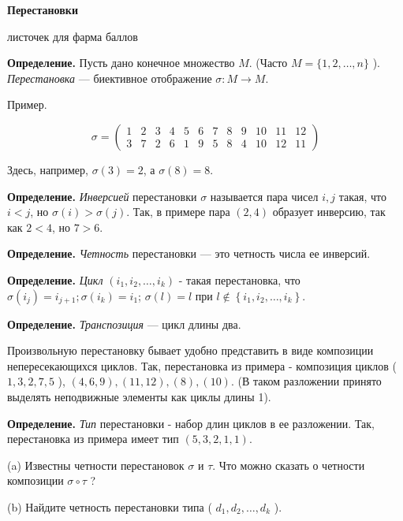 \centerline{\bf \Huge Перестановки}

\begin{flushright}
        \scriptsize{листочек для фарма баллов}
\end{flushright}

\textbf{Определение.} Пусть дано конечное множество $M$. (Часто $M=\{1,2, \ldots, n\}$ ). \textit{Перестановка} --- биективное отображение $\sigma: M \rightarrow M$.

Пример.

$$
\sigma=\left(\begin{array}{llllllllllll}
1 & 2 & 3 & 4 & 5 & 6 & 7 & 8 & 9 & 10 & 11 & 12 \\
3 & 7 & 2 & 6 & 1 & 9 & 5 & 8 & 4 & 10 & 12 & 11
\end{array}\right)
$$


Здесь, например, $\sigma(3)=2$, а $\sigma(8)=8$.

\textbf{Определение.} \textit{Инверсией} перестановки $\sigma$ называется пара чисел $i, j$ такая, что $i<j$, но $\sigma(i)>\sigma(j)$. Так, в примере пара $(2,4)$ образует инверсию, так как $2<4$, но $7>6$.

\textbf{Определение.} \textit{Четность} перестановки --- это четность числа ее инверсий.

\textbf{Определение.} \textit{Цикл} $\left(i_1, i_2, \ldots, i_k\right)$ - такая перестановка, что $\sigma\left(i_j\right)=i_{j+1} ; \sigma\left(i_k\right)=i_1$; $\sigma(l)=l$ при $l \notin\left\{i_1, i_2, \ldots, i_k\right\}$.

\textbf{Определение.} \textit{Транспозиция} --- цикл длины два.

Произвольную перестановку бывает удобно представить в виде композиции непересекающихся циклов. Так, перестановка из примера - композиция циклов ( $1,3,2,7,5$ ), $(4,6,9),(11,12),(8),(10)$. (В таком разложении принято выделять неподвижные элементы как циклы длины 1).

\textbf{Определение.} \textit{Тип} перестановки - набор длин циклов в ее разложении. Так, перестановка из примера имеет тип $(5,3,2,1,1)$.

(a) Известны четности перестановок $\sigma$ и $\tau$. Что можно сказать о четности композиции $\sigma \circ \tau$ ?

\noindent
(b) Найдите четность перестановки типа ( $d_1, d_2, \ldots, d_k$ ).


\newpage

\hspace{3mm}

